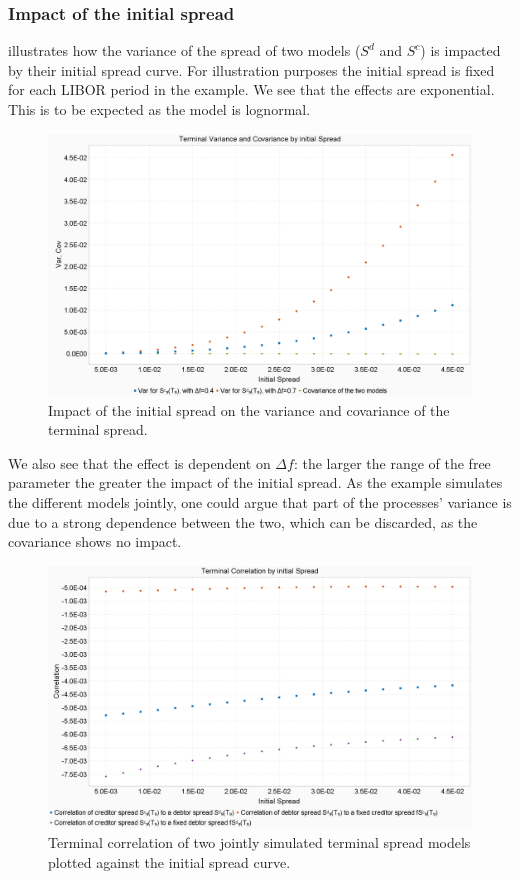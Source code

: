 \documentclass[12pt]{article}
\begin{document}
	\subsubsection{Impact of the initial spread}
	 illustrates how the variance of the spread of two models ($S^d$ and $S^c$) is impacted by their initial spread curve. For illustration purposes the initial spread is fixed for each LIBOR period in the example. We see that the effects are exponential. This is to be expected as the model is lognormal.
	\begin{figure}[h!]
		\centering
		\includegraphics[width=0.7\linewidth]{figures/Today/SpreadVarCovByInitSpread}
		\caption{Impact of the initial spread on the variance and covariance of the terminal spread.}
		\label{fig:spreadvarcovbyinitspread}
	\end{figure}
	We also see that the effect is dependent on $\Delta f$: the larger the range of the free parameter the greater the impact of the initial spread. As the example simulates the different models jointly, one could argue that part of the processes' variance is due to a strong dependence between the two, which can be discarded, as the covariance shows no impact.
	\begin{figure}[h!]
		\centering
		\includegraphics[width=0.7\linewidth]{figures/Today/SpreadCorrelationByInitSpread}
		\caption{Terminal correlation of two jointly simulated terminal spread models plotted against the initial spread curve.}
		\label{fig:spreadcorrelationbyinitspread}
	\end{figure}
\end{document}
